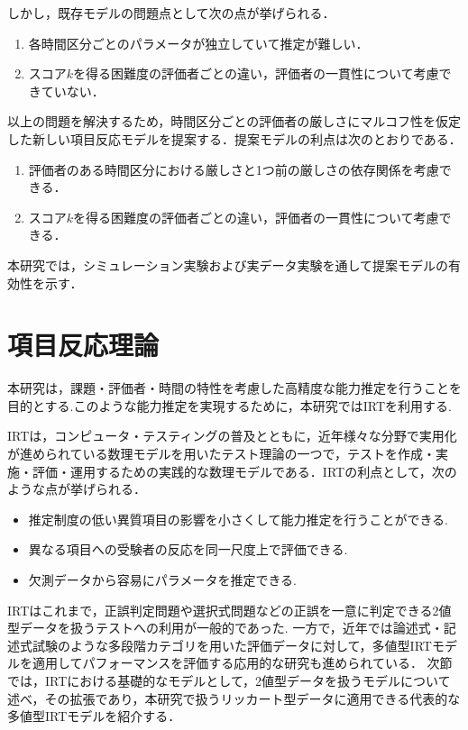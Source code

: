 \documentclass[a4paper,11pt,oneside,openany]{jsbook}
\begin{document}
しかし，既存モデルの問題点として次の点が挙げられる．
\begin{enumerate}
  \item 各時間区分ごとのパラメータが独立していて推定が難しい．
  \item スコア$k$を得る困難度の評価者ごとの違い，評価者の一貫性について考慮できていない．
\end{enumerate}  
以上の問題を解決するため，時間区分ごとの評価者の厳しさにマルコフ性を仮定した新しい項目反応モデルを提案する．提案モデルの利点は次のとおりである．
\begin{enumerate}
  \item 評価者のある時間区分における厳しさと1つ前の厳しさの依存関係を考慮できる．
  \item スコア$k$を得る困難度の評価者ごとの違い，評価者の一貫性について考慮できる．
\end{enumerate}
本研究では，シミュレーション実験および実データ実験を通して提案モデルの有効性を示す．
\newpage

\chapter{項目反応理論}
本研究は，課題・評価者・時間の特性を考慮した高精度な能力推定を行うことを目的とする.このような能力推定を実現するために，本研究ではIRTを利用する.

IRTは，コンピュータ・テスティングの普及とともに，近年様々な分野で実用化が進められている数理モデルを用いたテスト理論の一つで，テストを作成・実施・評価・運用するための実践的な数理モデルである\cite{IRTtext,IRTLord}．IRTの利点として，次のような点が挙げられる\cite{IRTUtoUeno}．
\begin{itemize}
\item 推定制度の低い異質項目の影響を小さくして能力推定を行うことができる.
\item 異なる項目への受験者の反応を同一尺度上で評価できる.
\item 欠測データから容易にパラメータを推定できる.
\end{itemize}

IRTはこれまで，正誤判定問題や選択式問題などの正誤を一意に判定できる2値型データを扱うテストへの利用が一般的であった. 一方で，近年では論述式・記述式試験のような多段階カテゴリを用いた評価データに対して，多値型IRTモデルを適用してパフォーマンスを評価する応用的な研究も進められている\cite{IRTMatteucci,IRTDeCarlo}．
次節では，IRTにおける基礎的なモデルとして，2値型データを扱うモデルについて述べ，その拡張であり，本研究で扱うリッカート型データに適用できる代表的な多値型IRTモデルを紹介する．
\end{document}
